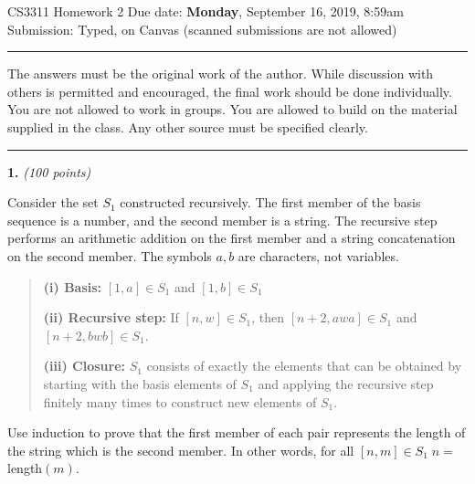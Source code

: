 \documentclass[12pt]{article}
\begin{document}
\thispagestyle{empty}

{\large CS3311 Homework 2} \hfill
Due date: {\bf Monday}, September 16, 2019, 8:59am\\
\hfill
Submission: Typed, on Canvas (scanned submissions are not allowed)
\vspace{-0.1in}

\rule{\textwidth}{0.5mm}
\begin{small}
The answers must be the original work of the author.  While discussion
with others is permitted and encouraged, the final work should be done
individually. You are not allowed to work in groups.  You are allowed to
build on the material supplied in the class. Any other source must be
specified clearly.
\end{small}
\rule{\textwidth}{0.5mm}

{\bf 1.} {\em (100 points)} 

Consider the set $S_1$ constructed recursively. 
The first member of the basis sequence is a number, and the second
member is a string. The recursive step performs an arithmetic addition on the 
first member and a string concatenation on the second member.
The symbols $a, b$ are characters, not variables.
\begin{quote}
{\bf (i) Basis:} $[1,a] \in S_1$ and $[1,b] \in S_1$

{\bf (ii) Recursive step:} If $[n,w] \in S_1$, then 
$[n+2, awa] \in S_1$ and $[n+2, bwb] \in S_1$.

{\bf (iii) Closure:} $S_1$ consists of exactly the elements that can be
obtained by starting with the basis elements of $S_1$ and applying the
recursive step finitely many times to construct new elements of $S_1$.
\end{quote}

Use induction to prove that the first member of each pair represents the
length of the string which is the second member. 
In other words, for all $[n,m] \in S_1 \; n=$length$(m)$.
\end{document}
